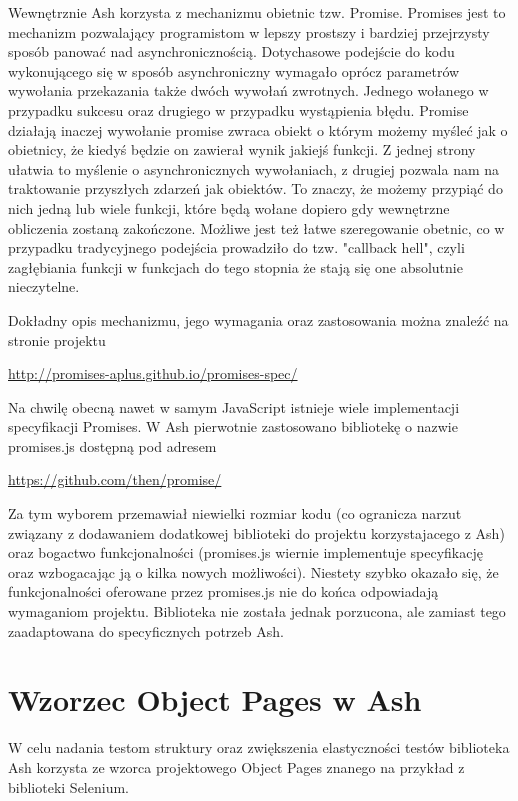\documentclass[brudnopis]{xmgr}
\begin{document}
Wewnętrznie Ash korzysta z mechanizmu obietnic tzw. Promise. Promises jest to mechanizm pozwalający programistom w lepszy prostszy i bardziej przejrzysty sposób panować nad  asynchronicznością. Dotychasowe podejście do kodu wykonującego się w sposób asynchroniczny wymagało oprócz parametrów wywołania przekazania także dwóch wywołań zwrotnych. Jednego wołanego w przypadku sukcesu oraz drugiego w przypadku wystąpienia błędu. Promise działają inaczej wywołanie promise zwraca obiekt o którym możemy myśleć jak o obietnicy, że kiedyś będzie on zawierał wynik jakiejś funkcji. Z jednej strony ułatwia to myślenie o asynchronicznych wywołaniach, z drugiej pozwala nam na traktowanie przyszłych zdarzeń jak obiektów. To znaczy, że możemy przypiąć do nich jedną lub wiele funkcji, które będą wołane dopiero gdy wewnętrzne obliczenia zostaną zakończone. Możliwe jest też łatwe szeregowanie obetnic, co w przypadku tradycyjnego podejścia prowadziło do tzw. "callback hell", czyli zagłębiania funkcji w funkcjach do tego stopnia że stają się one absolutnie nieczytelne. 

Dokładny opis mechanizmu, jego wymagania oraz zastosowania można znaleźć na  stronie projektu

\url{http://promises-aplus.github.io/promises-spec/}

Na chwilę obecną nawet w samym JavaScript istnieje wiele implementacji specyfikacji Promises. W Ash pierwotnie zastosowano bibliotekę o nazwie promises.js dostępną pod adresem

\url{https://github.com/then/promise/}

Za tym wyborem przemawiał niewielki rozmiar kodu (co ogranicza narzut związany z dodawaniem dodatkowej biblioteki do projektu korzystajacego z Ash) oraz bogactwo funkcjonalności (promises.js wiernie implementuje specyfikację oraz wzbogacając ją o kilka  nowych możliwości). Niestety szybko okazało się, że funkcjonalności oferowane przez promises.js nie do końca odpowiadają wymaganiom projektu. Biblioteka nie została jednak porzucona, ale zamiast tego zaadaptowana do specyficznych potrzeb Ash.  

\section{Wzorzec Object Pages w Ash}

W celu nadania testom struktury oraz zwiększenia elastyczności testów biblioteka Ash korzysta ze wzorca projektowego Object Pages znanego na przykład z biblioteki Selenium. 
\end{document}
